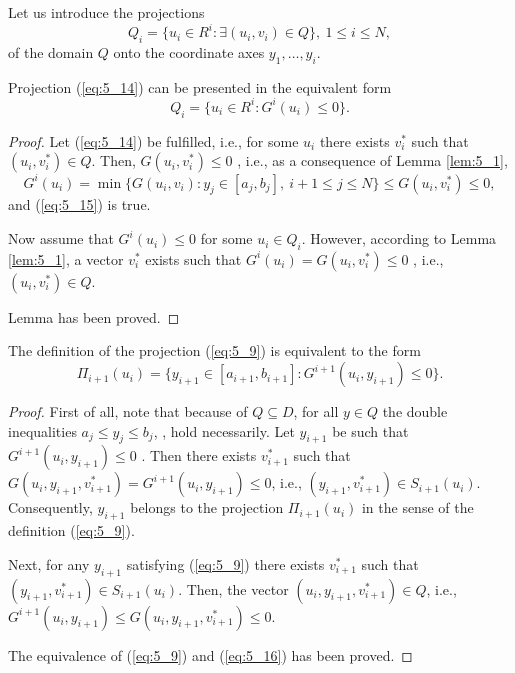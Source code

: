 Let us introduce the projections 
\begin{equation}
\label{eq:5_14}
Q_i=\{u_i\in R^i:\exists (u_i,v_i)\in Q\},\:1\leq i\leq N,
\end{equation}
of the domain $Q$ onto the coordinate axes $y_1,\ldots,y_i$.
\begin{lemma} 
\label{lem:5_2}
Projection (\ref{eq:5_14}) can be presented in the equivalent form 
\begin{equation}
\label{eq:5_15}
Q_i=\{u_i\in R^i:G^i(u_i)\leq 0\}.
\end{equation}
\end{lemma}
\begin{proof}
Let  (\ref{eq:5_14}) be fulfilled, i.e., for some $u_i$  there exists $v_i^*$  such that $(u_i,v_i^*)\in Q$. Then, $G(u_i,v_i^*)\leq 0$ , i.e., as a consequence of Lemma \ref{lem:5_1},
\begin{displaymath}
G^i(u_i)=\min\{G(u_i,v_i):y_j\in[a_j,b_j],\:i+1\leq j\leq N\}\leq G(u_i,v_i^*)\leq 0,
\end{displaymath}
and (\ref{eq:5_15}) is true.

Now assume that $G^i(u_i)\leq 0$  for some $u_i\in Q_i$. However, according to Lemma \ref{lem:5_1}, a vector $v_i^*$  exists such that $G^i(u_i)=G(u_i,v_i^*)\leq 0$ , i.e., $(u_i,v_i^*)\in Q$.

Lemma has been proved.
\end{proof}
\begin{lemma} 
\label{lem:5_3}
The definition of the projection (\ref{eq:5_9}) is equivalent to the form 
\begin{equation}
\label{eq:5_16}
\Pi_{i+1}(u_i)=\{y_{i+1}\in [a_{i+1},b_{i+1}]:G^{i+1}(u_i,y_{i+1})\leq 0\}.
\end{equation}
\end{lemma}
\begin{proof}
First of all, note that because of $Q\subseteq D$, for all $y\in Q$ the double inequalities $a_j\leq y_j\leq b_j$,  , hold necessarily. Let $y_{i+1}$  be such that $G^{i+1}(u_i,y_{i+1})\leq 0$ . Then there exists $v_{i+1}^*$  such that $G(u_i,y_{i+1},v_{i+1}^*)=G^{i+1}(u_i,y_{i+1})\leq 0$, i.e., $(y_{i+1}, v_{i+1}^*)\in S_{i+1}(u_i)$. Consequently, $y_{i+1}$  belongs to the projection $\Pi_{i+1}(u_i)$  in the sense of the definition (\ref{eq:5_9}).

Next, for any $y_{i+1}$  satisfying (\ref{eq:5_9}) there exists $v_{i+1}^*$  such that $(y_{i+1},v_{i+1}^*)\in S_{i+1}(u_i)$. Then, the vector $(u_i,y_{i+1},v_{i+1}^*)\in Q$, i.e., $G^{i+1}(u_i,y_{i+1})\leq G(u_i,y_{i+1},v_{i+1}^*)\leq 0$.

The equivalence of (\ref{eq:5_9}) and (\ref{eq:5_16})  has been proved.
\end{proof}
